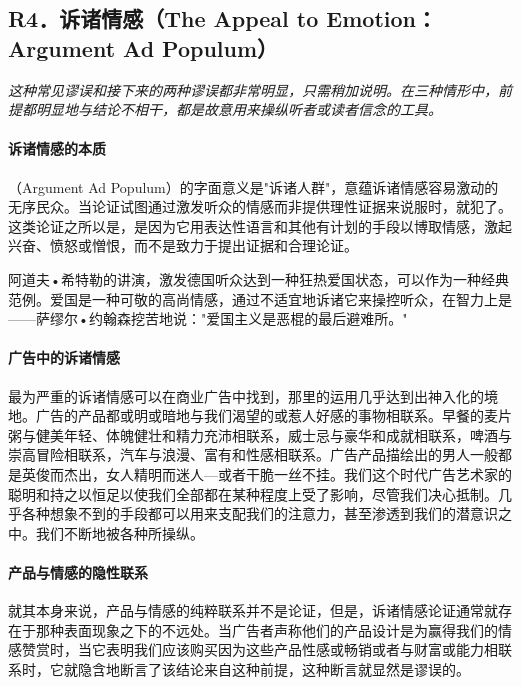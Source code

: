 \subsection{R4．诉诸情感（The Appeal to Emotion：Argument Ad Populum）}

\begin{logicbox}[title=引言]
\textit{这种常见谬误和接下来的两种谬误都非常明显，只需稍加说明。在三种情形中，前提都明显地与结论不相干，都是故意用来操纵听者或读者信念的工具。}
\end{logicbox}

\paragraph{诉诸情感的本质}
\begin{theorembox}[title=诉诸情感谬误的定义]
（Argument Ad Populum）的字面意义是"诉诸人群"，意蕴诉诸情感容易激动的无序民众。当论证试图通过激发听众的情感而非提供理性证据来说服时，就犯了。这类论证之所以是，是因为它用表达性语言和其他有计划的手段以博取情感，激起兴奋、愤怒或憎恨，而不是致力于提出证据和合理论证。
\end{theorembox}

阿道夫•希特勒的讲演，激发德国听众达到一种狂热爱国状态，可以作为一种经典范例。爱国是一种可敬的高尚情感，通过不适宜地诉诸它来操控听众，在智力上是——萨缪尔•约翰森挖苦地说："爱国主义是恶棍的最后避难所。"

\paragraph{广告中的诉诸情感}
\begin{examplebox}[title=商业广告中的诉诸情感]
最为严重的诉诸情感可以在商业广告中找到，那里的运用几乎达到出神入化的境地。广告的产品都或明或暗地与我们渴望的或惹人好感的事物相联系。早餐的麦片粥与健美年轻、体魄健壮和精力充沛相联系，威士忌与豪华和成就相联系，啤酒与崇高冒险相联系，汽车与浪漫、富有和性感相联系。广告产品描绘出的男人一般都是英俊而杰出，女人精明而迷人—或者干脆一丝不挂。我们这个时代广告艺术家的聪明和持之以恒足以使我们全部都在某种程度上受了影响，尽管我们决心抵制。几乎各种想象不到的手段都可以用来支配我们的注意力，甚至渗透到我们的潜意识之中。我们不断地被各种所操纵。
\end{examplebox}

\paragraph{产品与情感的隐性联系}
就其本身来说，产品与情感的纯粹联系并不是论证，但是，诉诸情感论证通常就存在于那种表面现象之下的不远处。当广告者声称他们的产品设计是为赢得我们的情感赞赏时，当它表明我们应该购买因为这些产品性感或畅销或者与财富或能力相联系时，它就隐含地断言了该结论来自这种前提，这种断言就显然是谬误的。

